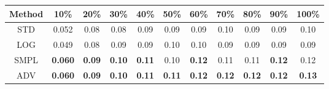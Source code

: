 \documentclass{standalone}
\begin{document}
\begin{tabular}{c|cccccccccc}
      \toprule
      Method & 10\% & 20\% & 30\% & 40\% & 50\% & 60\% & 70\% & 80\% & 90\% & 100\% \\
      \midrule
STD & 0.052 & 0.08 & 0.08 & 0.09 & 0.09 & 0.09 & 0.10 & 0.09 & 0.09 & 0.10\\
LOG & 0.049 & 0.08 & 0.09 & 0.09 & 0.10 & 0.10 & 0.09 & 0.09 & 0.09 & 0.09\\
SMPL & \textbf{0.060} & \textbf{0.09} & \textbf{0.10} & \textbf{0.11} & 0.10 & \textbf{0.12} & 0.11 & 0.11 & \textbf{0.12} & 0.12\\
ADV & \textbf{0.060} & \textbf{0.09} & \textbf{0.10} & \textbf{0.11} & \textbf{0.11} & \textbf{0.12} & \textbf{0.12} & \textbf{0.12} & \textbf{0.12} & \textbf{0.13}\\
  \bottomrule
\end{tabular}
\end{document}

